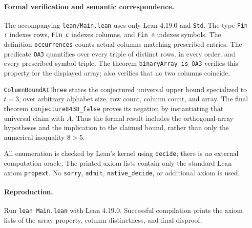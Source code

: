 \documentclass[10pt]{article}
\begin{document}
\paragraph{Formal verification and semantic correspondence.}
The accompanying \texttt{lean/Main.lean} uses only Lean 4.19.0 and \texttt{Std}. The type \texttt{Fin r} indexes rows, \texttt{Fin c} indexes columns, and \texttt{Fin n} indexes symbols. The definition \texttt{occurrences} counts actual columns matching prescribed entries. The predicate \texttt{OA3} quantifies over every triple of distinct rows, in every order, and every prescribed symbol triple. The theorem \texttt{binaryArray\_is\_OA3} verifies this property for the displayed array;  also verifies that no two columns coincide.

\texttt{ColumnBoundAtThree} states the conjectured universal upper bound specialized to $t=3$, over arbitrary alphabet size, row count, column count, and array. The final theorem \texttt{conjecture8438\_false} proves its negation by instantiating that universal claim with $A$. Thus the formal result includes the orthogonal-array hypotheses and the implication to the claimed bound, rather than only the numerical inequality $8>5$.

All enumeration is checked by Lean's kernel using \texttt{decide}; there is no external computation oracle. The printed axiom lists contain only the standard Lean axiom \texttt{propext}. No \texttt{sorry}, \texttt{admit}, \texttt{native\_decide}, or additional axiom is used.
\paragraph{Reproduction.}
Run \texttt{lean Main.lean} with Lean 4.19.0. Successful compilation prints the axiom lists of the array property, column distinctness, and final disproof.
\end{document}
